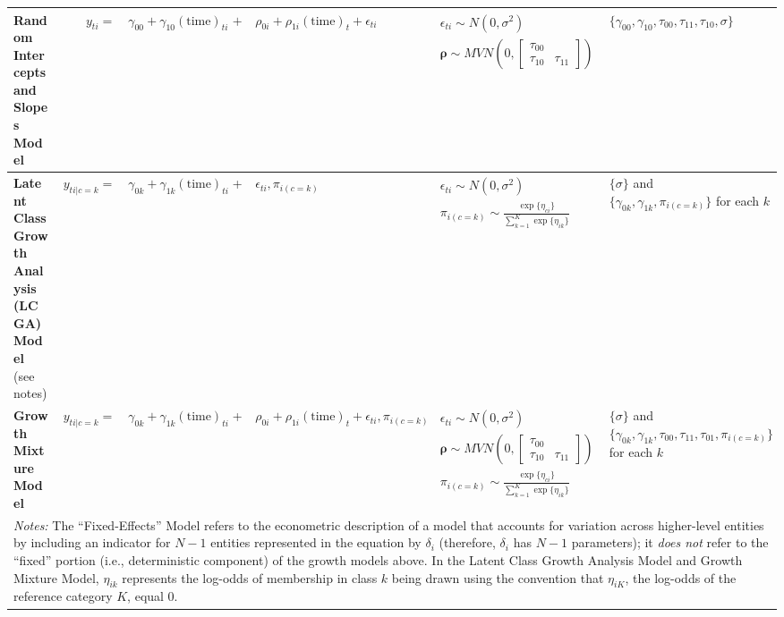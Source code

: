 \documentclass{memoir}
\begin{document}
\begin{table*}
\begin{tabular}{p{1.5in}rrclll}
\raggedright\textbf{Random Intercepts and Slopes Model} & 
    $y_{ti} =$&
    $\gamma_{00} + \gamma_{10}(\text{time})_{ti} $&$+$&
    $\rho_{0i}  + \rho_{1i}(\text{time})_{t} + \epsilon_{ti}$ &
    $\begin{array}{l}\epsilon_{ti} \sim N(0, \sigma^2) \\ \mathbf{\rho} \sim MVN\left(0, \begin{bmatrix}\tau_{00} & \\ \tau_{10} & \tau_{11}\end{bmatrix}\right)\end{array}$ &
    $\{\gamma_{00}, \gamma_{10}, \tau_{00}, \tau_{11}, \tau_{10}, \sigma\}$ \\\midrule

\raggedright\textbf{Latent Class Growth Analysis (LCGA) Model} (see notes)&
    $y_{ti|c=k} =$&
    $\gamma_{0k} + \gamma_{1k}(\text{time})_{ti}$ &+&
    $\epsilon_{ti}, \pi_{i(c=k)}$ & 
    $\begin{array}{l}\epsilon_{ti} \sim N(0, \sigma^2) \\ \pi_{i(c=k)} \sim \frac{\exp\{\eta_{ci}\}}{\sum^K_{k=1}\exp\{\eta_{ik}\}}\end{array}$ &
    \multicolumn{1}{l}{\parbox[c]{1.75in}{\raggedright$\{\sigma\}$ and \\ $\{\gamma_{0k}, \gamma_{1k}, \pi_{i(c=k)}\}$ for each $k$}}\\\midrule

\raggedright\textbf{Growth Mixture Model}&
    $y_{ti|c=k} =$&
    $\gamma_{0k} + \gamma_{1k}(\text{time})_{ti}$ &+&
    $\rho_{0i}  + \rho_{1i}(\text{time})_{t} + \epsilon_{ti}, \pi_{i(c=k)}$ & 
    $\begin{array}{l}\epsilon_{ti} \sim N(0, \sigma^2) \\ \mathbf{\rho} \sim MVN\left(0, \begin{bmatrix}\tau_{00} & \\ \tau_{10} & \tau_{11}\end{bmatrix}\right)\\ \pi_{i(c=k)} \sim \frac{\exp\{\eta_{ci}\}}{\sum^K_{k=1}\exp\{\eta_{ik}\}}\end{array}$ &
    \multicolumn{1}{l}{\parbox[c]{1.75in}{\raggedright$\{\sigma\}$ and \\ $\{\gamma_{0k}, \gamma_{1k}, \tau_{00}, \tau_{11}, \tau_{01}, \pi_{i(c=k)}\}$ for each $k$}}\\\bottomrule


\multicolumn{7}{p{\textwidth}}{\footnotesize
    \emph{Notes:} The ``Fixed-Effects'' Model refers to the econometric description of a model that accounts for variation across higher-level entities by including an indicator for $N{-}1$ entities represented in the equation by $\delta_i$ (therefore, $\delta_i$ has $N{-}1$ parameters); it \emph{does not} refer to the ``fixed'' portion (i.e., deterministic component) of the growth models above. In the Latent Class Growth Analysis Model and Growth Mixture Model, $\eta_{ik}$ represents the log-odds of membership in class $k$ being drawn using the convention that $\eta_{iK}$, the log-odds of the reference category $K$, equal 0.
}
\end{tabular}
\end{table*}
\end{document}
